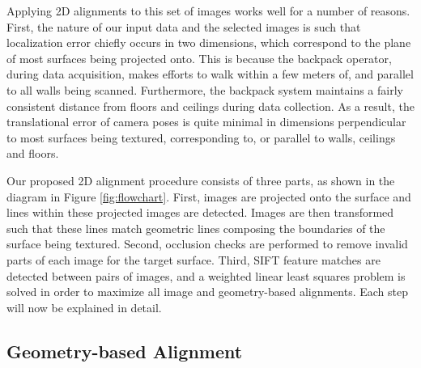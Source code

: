 \documentclass[]{spie}  %
\begin{document}
Applying 2D alignments to this set of images works well for a number
of reasons. First, the nature of our input data and the selected
images is such that localization error chiefly occurs in two
dimensions, which correspond to the plane of most surfaces being
projected onto. This is because the backpack operator, during data
acquisition, makes efforts to walk within a few meters of, and
parallel to all walls being scanned. Furthermore, the backpack system
maintains a fairly consistent distance from floors and ceilings during
data collection. As a result, the translational error of camera poses
is quite minimal in dimensions perpendicular to most surfaces being
textured, corresponding to, or parallel to walls, ceilings and
floors. 

Our proposed 2D alignment procedure consists of three parts, as shown
in the diagram in Figure \ref{fig:flowchart}. First, images are
projected onto the surface and lines within these projected images are
detected. Images are then transformed such that these lines match
geometric lines composing the boundaries of the surface being
textured. Second, occlusion checks are performed to remove invalid
parts of each image for the target surface. Third, SIFT feature
matches are detected between pairs of images, and a weighted linear
least squares problem is solved in order to maximize all image and
geometry-based alignments. Each step will now be explained in detail.


\subsection{Geometry-based Alignment}
\label{sec:geometryAlignment}
\end{document}
